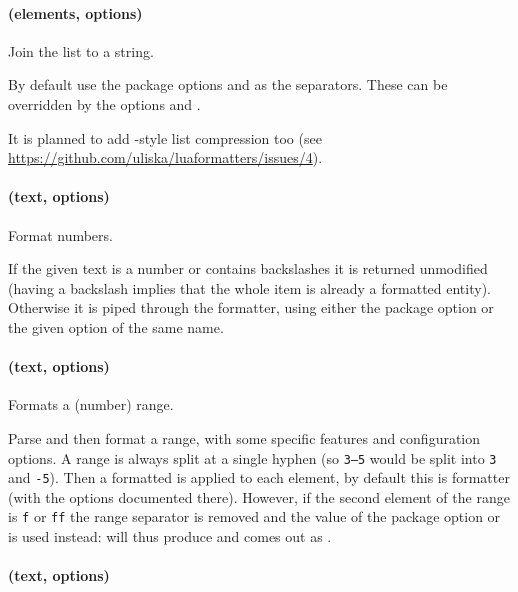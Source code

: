 \documentclass[12pt]{scrartcl}
\begin{document}
\paragraph{ (elements, options)}

Join the list to a string.

By default use the package options  and 
as the separators. These can be overridden  by the options 
and .

It is planned to add -style list compression too (see
\url{https://github.com/uliska/luaformatters/issues/4}).

\paragraph{ (text, options)}

Format numbers.

If the given text is a number or contains backslashes it is returned unmodified
(having a backslash implies that the whole item is already a formatted
entity). Otherwise it is piped through the  formatter, using either
the package option  or the given option of the same name.


\paragraph{ (text, options)}

Formats a (number) range.

Parse and then format a range, with some specific features and configuration
options.  A range is always split at a single hyphen (so \texttt{3--5} would be
split into \texttt{3} and \texttt{-5}).  Then a formatted is applied to each
element, by default this is  formatter (with the options
documented there).  However, if the second element of the range is \texttt{f} or
\texttt{ff} the range separator is removed and the value of the package option
 or  is used instead:
\texttt{} will thus produce  and
\texttt{} comes out as
.


\paragraph{ (text, options)}
\end{document}
